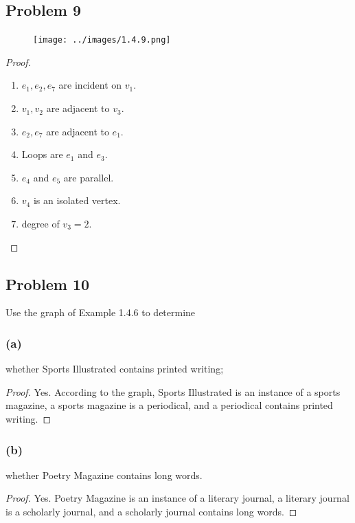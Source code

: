 \documentclass[14pt]{extarticle}
\begin{document}
\subsection{Problem 9}

\begin{figure}[ht!]
\centering
\texttt{[image: ../images/1.4.9.png]}
\end{figure}

\begin{proof}
\begin{enumerate}
\item $e_1, e_2, e_7$ are incident on $v_1$.
\item $v_1, v_2$ are adjacent to $v_3$.
\item $e_2, e_7$ are adjacent to $e_1$.
\item Loops are $e_1$ and $e_3$.
\item $e_4$ and $e_5$ are parallel.
\item $v_4$ is an isolated vertex.
\item degree of $v_3 = 2$.
\end{enumerate}
\end{proof}

\subsection{Problem 10}
Use the graph of Example 1.4.6 to determine

\subsubsection{(a)}
whether Sports Illustrated contains printed writing;

\begin{proof}
Yes. According to the graph, Sports Illustrated is an instance of a sports
magazine, a sports magazine is a periodical, and a periodical contains printed
writing.
\end{proof}

\subsubsection{(b)}
whether Poetry Magazine contains long words.

\begin{proof}
Yes. Poetry Magazine is an instance of a literary journal, a literary journal is
a scholarly journal, and a scholarly journal contains long words.
\end{proof}
\end{document}
